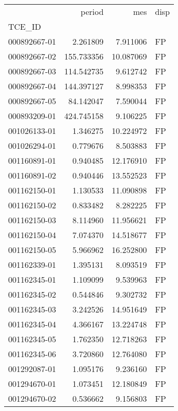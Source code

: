 \begin{tabular}{lrrl}
\toprule
{} &      period &            mes & disp \\
TCE\_ID       &             &                &      \\
\midrule
000892667-01 &    2.261809 &       7.911006 &   FP \\
000892667-02 &  155.733356 &      10.087069 &   FP \\
000892667-03 &  114.542735 &       9.612742 &   FP \\
000892667-04 &  144.397127 &       8.998353 &   FP \\
000892667-05 &   84.142047 &       7.590044 &   FP \\
000893209-01 &  424.745158 &       9.106225 &   FP \\
001026133-01 &    1.346275 &      10.224972 &   FP \\
001026294-01 &    0.779676 &       8.503883 &   FP \\
001160891-01 &    0.940485 &      12.176910 &   FP \\
001160891-02 &    0.940446 &      13.552523 &   FP \\
001162150-01 &    1.130533 &      11.090898 &   FP \\
001162150-02 &    0.833482 &       8.282225 &   FP \\
001162150-03 &    8.114960 &      11.956621 &   FP \\
001162150-04 &    7.074370 &      14.518677 &   FP \\
001162150-05 &    5.966962 &      16.252800 &   FP \\
001162339-01 &    1.395131 &       8.093519 &   FP \\
001162345-01 &    1.109099 &       9.539963 &   FP \\
001162345-02 &    0.544846 &       9.302732 &   FP \\
001162345-03 &    3.242526 &      14.951649 &   FP \\
001162345-04 &    4.366167 &      13.224748 &   FP \\
001162345-05 &    1.762350 &      12.718263 &   FP \\
001162345-06 &    3.720860 &      12.764080 &   FP \\
001292087-01 &    1.095176 &       9.236160 &   FP \\
001294670-01 &    1.073451 &      12.180849 &   FP \\
001294670-02 &    0.536662 &       9.156803 &   FP \\

\end{tabular}
